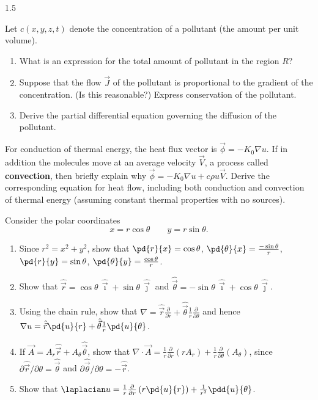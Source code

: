 \begin{exercises}{1.5}

\item Let $c(x,y,z,t)$ denote the concentration of a pollutant (the amount per unit volume).
\begin{enumerate}
\item[(a)] What is an expression for the total amount of pollutant in the region $R$?
\item[(b)] Suppose that the flow $\vec{J}$ of the pollutant is proportional to the gradient of the concentration. (Is this reasonable?) Express conservation of the pollutant.
\item[(c)] Derive the partial differential equation governing the diffusion of the pollutant.
\end{enumerate}

\item[\starred 1.5.2.] For conduction of thermal energy, the heat flux vector is $\vec{\phi} = -K_0\nabla u$. If in addition the molecules move at an average velocity $\vec{V}$, a process called \textbf{convection}, then briefly explain why $\vec{\phi} = -K_0\nabla u + c\rho u\vec{V}$. Derive the corresponding equation for heat flow, including both conduction and convection of thermal energy (assuming constant thermal properties with no sources).

\item Consider the polar coordinates
\[
x = r\cos\theta \qquad y = r\sin\theta.
\]
\begin{enumerate}
\item[(a)] Since $r^2 = x^2 + y^2$, show that $\pd{r}{x} = \cos\theta$, $\pd{\theta}{x} = \frac{-\sin\theta}{r}$, $\pd{r}{y} = \sin\theta$, $\pd{\theta}{y} = \frac{\cos\theta}{r}$.
\item[(b)] Show that $\hat{\vec{r}} = \cos\theta\,\hat{\vec{\imath}} + \sin\theta\,\hat{\vec{\jmath}}$ and $\hat{\vec{\theta}} = -\sin\theta\,\hat{\vec{\imath}} + \cos\theta\,\hat{\vec{\jmath}}$.
\item[(c)] Using the chain rule, show that $\nabla = \hat{\vec{r}}\frac{\partial}{\partial r} + \hat{\vec{\theta}}\frac{1}{r}\frac{\partial}{\partial \theta}$ and hence $\nabla u = \hat{\vec{r}}\pd{u}{r} + \hat{\vec{\theta}}\frac{1}{r}\pd{u}{\theta}$.
\item[(d)] If $\vec{A} = A_r\hat{\vec{r}} + A_\theta\hat{\vec{\theta}}$, show that $\nabla\cdot\vec{A} = \frac{1}{r}\frac{\partial}{\partial r}(rA_r) + \frac{1}{r}\frac{\partial}{\partial \theta}(A_\theta)$, since $\partial\hat{\vec{r}}/\partial\theta = \hat{\vec{\theta}}$ and $\partial\hat{\vec{\theta}}/\partial\theta = -\hat{\vec{r}}$.
\item[(e)] Show that $\laplacian u = \frac{1}{r}\frac{\partial}{\partial r}\left(r\pd{u}{r}\right) + \frac{1}{r^2}\pdd{u}{\theta}$.
\end{enumerate}


\end{exercises}
